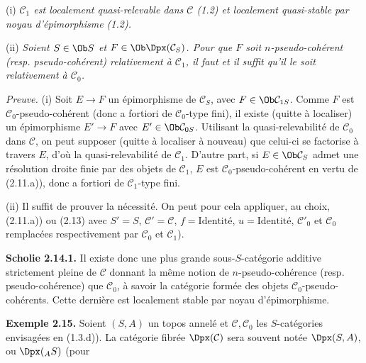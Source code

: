 (i) \emph{\(\mathcal C_1\) est localement quasi-relevable dans \(\mathcal C\) (1.2) et localement quasi-stable par noyau d'épimorphisme (1.2).}

(ii) \emph{Soient \(S\in\Ob S\) et \(F\in\Ob\Dpx(\mathcal C_S)\). Pour que \(F\) soit \(n\)-pseudo-cohérent (resp. pseudo-cohérent) relativement à \(\mathcal C_1\), il faut et il suffit qu'il le soit relativement à \(\mathcal C_0\).}

\emph{Preuve.} (i) Soit \(E\to F\) un épimorphisme de \(\mathcal C_S\), avec \(F\in\Ob\mathcal C_{1S}\). Comme \(F\) est \(\mathcal C_0\)-pseudo-cohérent (donc a fortiori de \(\mathcal C_0\)-type fini), il existe (quitte à localiser) un épimorphisme \(E'\to F\) avec \(E'\in\Ob\mathcal C_{0S}\). Utilisant la quasi-relevabilité de \(\mathcal C_0\) dans \(\mathcal C\), on peut supposer (quitte à localiser à nouveau) que celui-ci se factorise à travers \(E\), d'où la quasi-relevabilité de \(\mathcal C_1\). D'autre part, si \(E\in\Ob\mathcal C_S\) admet une résolution droite finie par des objets de \(\mathcal C_1\), \(E\) est \(\mathcal C_0\)-pseudo-cohérent en vertu de (2.11.a)), donc a fortiori de \(\mathcal C_1\)-type fini.

(ii) Il suffit de prouver la nécessité. On peut pour cela appliquer, au choix, (2.11.a)) ou (2.13) avec \(S'=S\), \(\mathcal C'=\mathcal C\), \(f=\text{Identité}\), \(u=\text{Identité}\), \(\mathcal C'_0\) et \(\mathcal C_0\) remplacées respectivement par \(\mathcal C_0\) et \(\mathcal C_1\)).

\textbf{Scholie 2.14.1.} Il existe donc une plus grande sous-\(S\)-catégorie additive strictement pleine de \(\mathcal C\) donnant la même notion de \(n\)-pseudo-cohérence (resp. pseudo-cohérence) que \(\mathcal C_0\), à savoir la catégorie formée des objets \(\mathcal C_0\)-pseudo-cohérents. Cette dernière est localement stable par noyau d'épimorphisme.

\textbf{Exemple 2.15.} Soient \((S,A)\) un topos annelé et \(\mathcal C,\mathcal C_0\) les \(S\)-catégories envisagées en (1.3.d)). La catégorie fibrée \(\Dpx(\mathcal C)\) sera souvent notée \(\Dpx(S,A)\), ou \(\Dpx({}_A S)\) (pour
